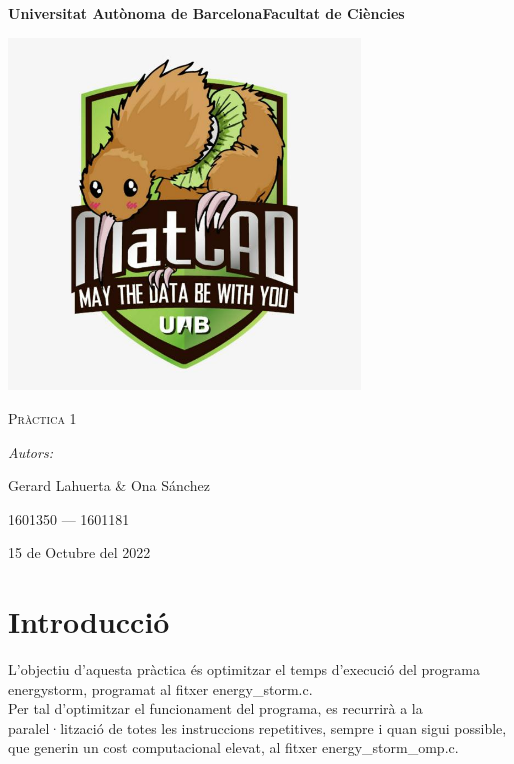 \documentclass[a4paper, 11pt]{article}
\begin{document}
\begin{titlepage}
    \centering
    {\bfseries\LARGE \hspace{1.9em} Universitat Autònoma de Barcelona\newline Facultat de Ciències\par}
    \vspace{2cm}
    {\hspace{-1em}\includegraphics[width=0.7\textwidth]{MatCAD3.jpg}\par}
    \vspace{1cm}
    {\scshape\Huge Pràctica 1\par} 
    \vspace{1cm}
    {\Large \itshape Autors: \par}
    {\Large \hspace{-1.75em} Gerard Lahuerta \& Ona Sánchez \par}
    {\Large 1601350 --- 1601181 \par}
    \vspace{1cm}
    {\Large 15 de Octubre del 2022\par}
\end{titlepage}

\justifying

\newpage
\section{Introducció}
L'objectiu d'aquesta pràctica és optimitzar el temps d'execució del programa \textcolor{frenchblue}{energystorm}, programat al fitxer \textcolor{darkpastelgreen}{energy\_storm.c}. \\
Per tal d'optimitzar el funcionament del programa, es recurrirà a la paralel·lització de totes les instruccions repetitives, sempre i quan sigui possible, que generin un cost computacional elevat, al fitxer \textcolor{darkpastelgreen}{energy\_storm\_omp.c}. \\
\end{document}
